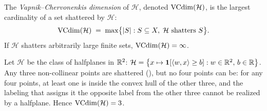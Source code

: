 \begin{defn}
\label{def:vc-dim}
The \emph{Vapnik--Chervonenkis dimension} of $\mathcal{H}$, denoted
$\mathrm{VCdim}(\mathcal{H})$, is the largest cardinality of a set shattered by
$\mathcal{H}$:
\[
  \mathrm{VCdim}(\mathcal{H}) \;=\; \max\bigl\{|S| : S \subseteq X,\; \mathcal{H}
  \text{ shatters } S\bigr\}.
\]
If $\mathcal{H}$ shatters arbitrarily large finite sets,
$\mathrm{VCdim}(\mathcal{H}) = \infty$.
\end{defn}

\begin{example}[Halfplanes in $\R^2$]
\label{ex:halfplanes-shatter}
Let $\mathcal{H}$ be the class of halfplanes in $\R^2$:
$\mathcal{H} = \bigl\{x \mapsto \mathbf{1}[\langle w, x \rangle \geq b] : w \in
\mathbb{R}^2,\, b \in \mathbb{R}\bigr\}$.  Any three non-collinear points are shattered
(), but no four points can be: for any four
points, at least one is inside the convex hull of the other three, and the
labeling that assigns it the opposite label from the other three cannot be
realized by a halfplane.  Hence $\mathrm{VCdim}(\mathcal{H}) = 3$.
\end{example}

